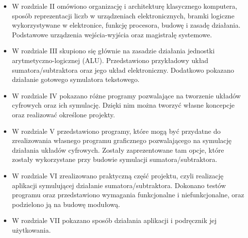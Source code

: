 \documentclass[12pt, a4paper, onside, polish]{article}				%
\begin{document}
\begin{itemize}
\item W rozdziale II omówiono organizację i architekturę klasycznego komputera, sposób reprezentacji liczb w urządzeniach elektronicznych, bramki logiczne wykorzystywane w elektronice, funkcję procesora, budowę i zasadę działania. Podstawowe urządzenia wejścia-wyjścia oraz magistralę systemowe.

\item W rozdziale III skupiono się głównie na zasadzie działania jednostki arytmetyczno-logicznej (ALU). Przedstawiono przykładowy układ sumatora/subtraktora oraz jego układ elektroniczny. Dodatkowo pokazano działanie gotowego symulatora tekstowego.

\item W rozdziale IV pokazano różne programy pozwalające na tworzenie układów cyfrowych oraz ich symulację. Dzięki nim można tworzyć własne koncepcje oraz realizować określone projekty. 

\item W rozdziale V przedstawiono programy, które mogą być przydatne do zrealizowania własnego programu graficznego pozwalającego na symulację działania układów cyfrowych. Zostały zaprezentowane tam opcje, które zostały wykorzystane przy budowie symulacji sumatora/subtraktora.

\item W rozdziale VI zrealizowano praktyczną część projektu, czyli realizację aplikacji symulującej działanie sumatora/subtraktora. Dokonano testów programu oraz przedstawiono wymagania funkcjonalne i niefunkcjonalne, oraz podzielono ją na budowę modułową.

 \item W rozdziale VII pokazano sposób działania aplikacji i podręcznik jej użytkowania.


\end{itemize}
 
 \cleardoublepage
\end{document}
